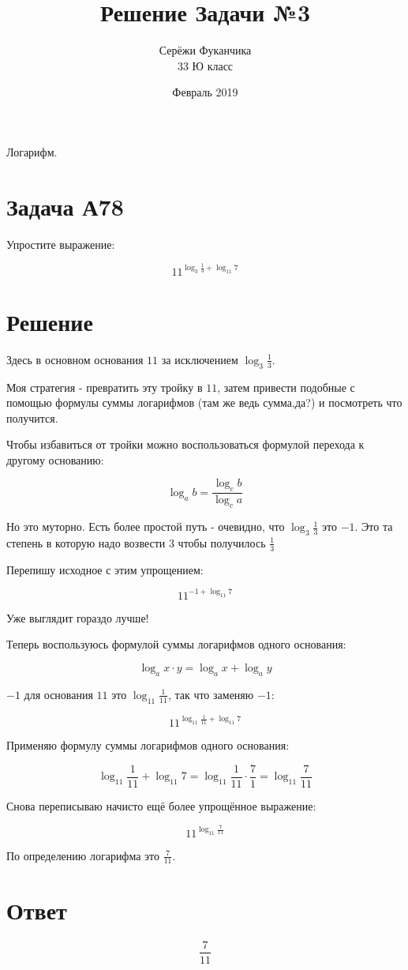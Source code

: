 \documentclass{article}
\title{Решение Задачи №3}
\author{Серёжи Фуканчика\\33 Ю класс}
\date{Февраль 2019}
\begin{document}
\maketitle
Логарифм.
\section{Задача А78}
Упростите выражение:

$$11^{\log_{3}{\frac{1}{3}}+\log_{11}{7}}$$

\section{Решение}
Здесь в основном основания $11$ за исключением $\log_{3}{\frac{1}{3}}$.

Моя стратегия - превратить эту тройку в $11$, затем привести подобные с помощью формулы суммы логарифмов (там же ведь сумма,да?) и посмотреть что получится.

Чтобы избавиться от тройки можно воспользоваться формулой перехода к другому основанию:

$$\log_{a}{b} = \frac{\log_{c}{b}}{\log_{c}{a}}$$

Но это муторно. Есть более простой путь - очевидно, что $\log_{3}{\frac{1}{3}}$ это $-1$. Это та степень в которую надо возвести $3$ чтобы получилось $\frac{1}{3}$

Перепишу исходное с этим упрощением:

$$11^{-1+\log_{11}{7}}$$

Уже выглядит гораздо лучше!

Теперь воспользуюсь формулой суммы логарифмов одного основания:

$$\log_{a}{x\cdot{}y} = \log_{a}{x} + \log_{a}{y}$$

$-1$ для основания $11$ это $\log_{11}{\frac{1}{11}}$, так что заменяю $-1$:

$$11^{\log_{11}{\frac{1}{11}}+\log_{11}{7}}$$

Применяю формулу суммы логарифмов одного основания:

$$\log_{11}{\frac{1}{11}}+\log_{11}{7}=\log_{11}{\frac{1}{11}}\cdot\frac{7}{1}=\log_{11}\frac{7}{11}$$

Снова переписываю начисто ещё более упрощённое выражение:

$$11^{\log_{11}{\frac{7}{11}}}$$

По определению логарифма это $\frac{7}{11}$.

\section{Ответ}
$$\frac{7}{11}$$
\end{document}
